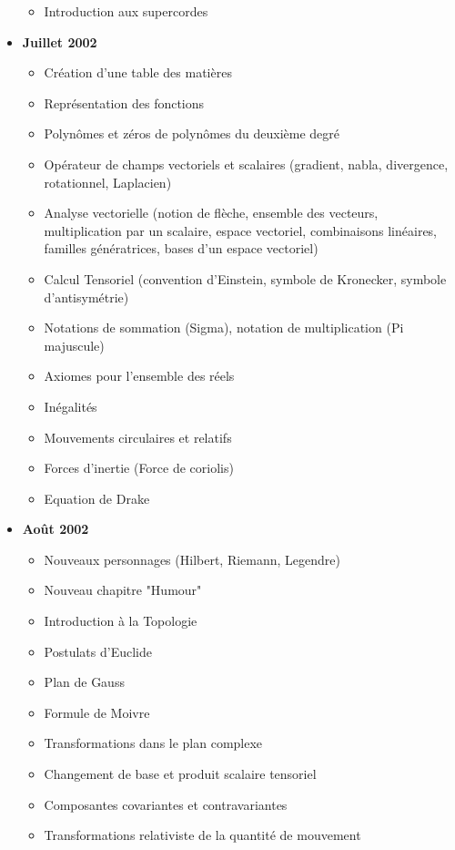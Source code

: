 \documentclass[12pt,a4paper,twoside,openright]{report}
\theoremstyle{definition}
\theoremstyle{itexmp}
\numberwithin{equation}{section}
\begin{document}
\begin{itemize}
\begin{itemize}[noitemsep]
				\item Introduction aux supercordes
			\end{itemize}
		\item \textbf{Juillet 2002}
			\begin{itemize}[noitemsep]
				\item Création d'une table des matières
				\item Représentation des fonctions
				\item Polynômes et zéros de polynômes du deuxième degré
				\item Opérateur de champs vectoriels et scalaires (gradient, nabla, divergence, rotationnel, Laplacien)
				\item Analyse vectorielle (notion de flèche, ensemble des vecteurs, multiplication par un scalaire, espace vectoriel, combinaisons linéaires, familles génératrices, bases d'un espace vectoriel)
				\item Calcul Tensoriel (convention d'Einstein, symbole de Kronecker, symbole d'antisymétrie)
				\item Notations de sommation (Sigma), notation de multiplication (Pi majuscule)
				\item Axiomes pour l'ensemble des réels
				\item Inégalités
				\item Mouvements circulaires et relatifs
				\item Forces d'inertie (Force de coriolis)
				\item Equation de Drake
			\end{itemize}
		\item \textbf{Août 2002}
			\begin{itemize}[noitemsep]
				\item Nouveaux personnages (Hilbert, Riemann, Legendre)
				\item Nouveau chapitre "Humour"
				\item Introduction à la Topologie
				\item Postulats d'Euclide
				\item Plan de Gauss
				\item Formule de Moivre
				\item Transformations dans le plan complexe
				\item Changement de base et produit scalaire tensoriel
				\item Composantes covariantes et contravariantes
				\item Transformations relativiste de la quantité de mouvement

\end{itemize}
\end{itemize}
\end{document}
